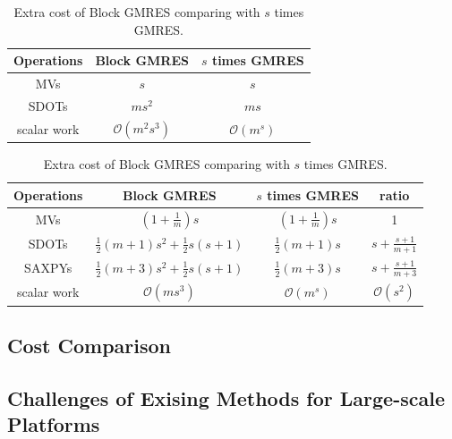 \begin{table}[htbp]
	\renewcommand{\arraystretch}{1.4}
	\small	
	\caption{Extra cost of Block GMRES comparing with $s$ times GMRES.}
	\label{block-gmres-extra}
	\centering
	\begin{tabular}{c|c|c}
		\toprule
		Operations & Block GMRES & $s$ times GMRES  \\
		\midrule
		MVs  & $s$ & $s$ \\
		SDOTs & $ms^2$ & $ms$   \\
		scalar work & $\mathcal{O}(m^2s^3)$ & $\mathcal{O}(m^s)$ \\
		\bottomrule
	\end{tabular}
\end{table}

\begin{table}[htbp]
	\renewcommand{\arraystretch}{1.4}
	\small	
	\caption{Extra cost of Block GMRES comparing with $s$ times GMRES.}
	\label{block-gmres}
	\centering
	\begin{tabular}{c|c|c|c}
		\toprule
		Operations & Block GMRES & $s$ times GMRES & ratio  \\
		\midrule
		MVs  & $(1+\frac{1}{m})s$ & $(1+\frac{1}{m})s$ & 1\\
		SDOTs & $\frac{1}{2}(m+1)s^2+\frac{1}{2}s(s+1)$ & $\frac{1}{2}(m+1)s$ & $s+\frac{s+1}{m+1}$   \\
		SAXPYs &  $\frac{1}{2}(m+3)s^2+\frac{1}{2}s(s+1)$ & $\frac{1}{2}(m+3)s$ & $s+\frac{s+1}{m+3}$ \\
		scalar work & $\mathcal{O}(ms^3)$ & $\mathcal{O}(m^s)$& $\mathcal{O}(s^2)$\\
		\bottomrule
	\end{tabular}
\end{table}

\subsection{Cost Comparison}


\subsection{Challenges of Exising Methods for Large-scale Platforms}

